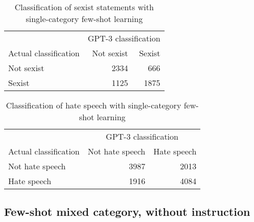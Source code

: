 \documentclass{bmcart}
\begin{document}
\begin{backmatter}
\begin{table}[!h]

\caption{\label{tab:fewshotsingle-sexism}Classification of sexist statements with single-category few-shot learning}
\centering
\fontsize{8}{10}\selectfont
\begin{tabular}[t]{lrr}
\hline
\multicolumn{1}{c}{ } & \multicolumn{2}{c}{GPT-3 classification} \\
Actual classification & Not sexist & Sexist\\
\hline
Not sexist & 2334 & 666\\
Sexist & 1125 & 1875\\
\hline
\end{tabular}
\end{table}

\begin{table}[!h]

\caption{\label{tab:fewshotsingle-hate}Classification of hate speech with single-category few-shot learning}
\centering
\fontsize{8}{10}\selectfont
\begin{tabular}[t]{lrr}
\hline
\multicolumn{1}{c}{ } & \multicolumn{2}{c}{GPT-3 classification} \\
Actual classification & Not hate speech & Hate speech\\
\hline
Not hate speech & 3987 & 2013\\
Hate speech & 1916 & 4084\\
\hline
\end{tabular}
\end{table}

\newpage


\subsection{Few-shot mixed category, without instruction}\label{appendxbmuxedubsnorinstruction}

\begin{table}[!h]


\end{table}
\end{backmatter}
\end{document}
